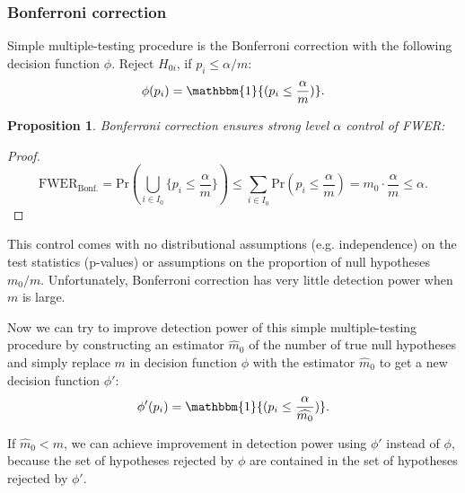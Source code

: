 \documentclass[10pt]{article}
\newtheorem{proposition}[theorem]{Proposition}
\begin{document}
\subsubsection{Bonferroni correction}

Simple multiple-testing procedure is the Bonferroni correction with the following decision function $\phi$. Reject $H_{0i}$, if $p_{i} \leq \alpha/ m$: 
\begin{equation}
	\phi(p_{i}) = \mathbbm{1}{(p_{i} \leq \frac{\alpha}{m})}.
\end{equation} 

\begin{proposition} \label{prop: Bonf}
	Bonferroni correction ensures strong level $\alpha$ control of FWER:
\end{proposition}
\begin{proof}
	\begin{equation} \label{eq: bonf_control}
	\text{FWER}_{\text{Bonf.}} = \text{Pr}(\bigcup_{i \in I_{0}} \lbrace p_{i} \leq \frac{\alpha}{m} \rbrace) \leq \sum_{i \in I_{0}} \text{Pr}(p_{i} \leq \frac{\alpha}{m})
	= m_{0} \cdot \frac{\alpha}{m} \leq \alpha.
	\end{equation}
\end{proof}

This control comes with no distributional assumptions (e.g. independence) on the test statistics (p-values) or assumptions on the proportion of null hypotheses $m_{0}/m$. Unfortunately, Bonferroni correction has very little detection power when $m$ is large. 

Now we can try to improve detection power of this simple multiple-testing procedure by constructing an estimator $\widehat{m}_{0}$ of the number of true null hypotheses and simply replace $m$ in decision function $\phi$ with the estimator $\widehat{m}_{0}$ to get a new decision function $\phi'$: 
\begin{equation}
	\phi'(p_{i}) = \mathbbm{1}{(p_{i} \leq \frac{\alpha}{\widehat{m_{0}}})}.
\end{equation}

If $\widehat{m}_{0} < m$, we can achieve improvement in detection power using $\phi'$ instead of $\phi$, because the set of hypotheses rejected by $\phi$ are contained in the set of hypotheses rejected by $\phi'$. 
\end{document}
